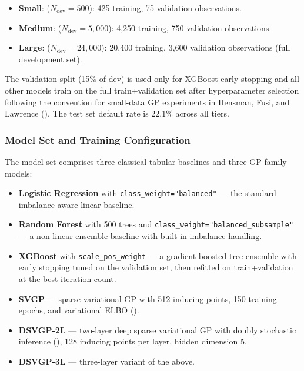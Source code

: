 \documentclass[
  letterpaper,
  DIV=11,
  numbers=noendperiod]{scrartcl}
\providecommand{\tightlist}{%
  \setlength{\itemsep}{0pt}\setlength{\parskip}{0pt}}
\begin{document}
\begin{itemize}
\tightlist
\item
  \textbf{Small}: (\(N_{\text{dev}} = 500\)): 425 training, 75
  validation observations.
\item
  \textbf{Medium}: (\(N_{\text{dev}} = 5{,}000\)): 4,250 training, 750
  validation observations.
\item
  \textbf{Large}: (\(N_{\text{dev}} = 24{,}000\)): 20,400 training,
  3,600 validation observations (full development set).
\end{itemize}

The validation split (15\% of dev) is used only for XGBoost early
stopping and all other models train on the full train+validation set
after hyperparameter selection following the convention for small-data
GP experiments in Hensman, Fusi, and Lawrence
(). The test set default rate
is 22.1\% across all tiers.

\subsubsection{Model Set and Training
Configuration}\label{sec-uci-models}

The model set comprises three classical tabular baselines and three
GP-family models:

\begin{itemize}
\tightlist
\item
  \textbf{Logistic Regression} with \texttt{class\_weight="balanced"}
  --- the standard imbalance-aware linear baseline.
\item
  \textbf{Random Forest} with 500 trees and
  \texttt{class\_weight="balanced\_subsample"} --- a non-linear ensemble
  baseline with built-in imbalance handling.
\item
  \textbf{XGBoost} with \texttt{scale\_pos\_weight} --- a
  gradient-boosted tree ensemble with early stopping tuned on the
  validation set, then refitted on train+validation at the best
  iteration count.
\item
  \textbf{SVGP} --- sparse variational GP with 512 inducing points, 150
  training epochs, and variational ELBO
  ().
\item
  \textbf{DSVGP-2L} --- two-layer deep sparse variational GP with doubly
  stochastic inference (), 128 inducing points per layer, hidden dimension
  5.
\item
  \textbf{DSVGP-3L} --- three-layer variant of the above.
\end{itemize}
\end{document}
